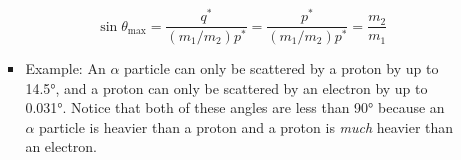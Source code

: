 \documentclass[../notes.tex]{subfiles}
\begin{document}
\begin{itemize}
\begin{itemize}
\begin{itemize}
            \begin{equation*}
                \sin\theta_\text{max} = \frac{q^*}{(m_1/m_2)p^*}
                = \frac{p^*}{(m_1/m_2)p^*}
                = \frac{m_2}{m_1}
            \end{equation*}
            \item Example: An $\alpha$ particle can only be scattered by a proton by up to \ang{14.5}, and a proton can only be scattered by an electron by up to \ang{0.031}. Notice that both of these angles are less than \ang{90} because an $\alpha$ particle is heavier than a proton and a proton is \emph{much} heavier than an electron.
        \end{itemize}
    \end{itemize}
\end{itemize}
\end{document}
